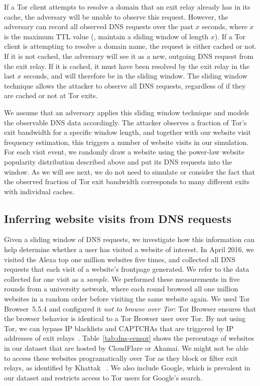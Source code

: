 If a Tor client attempts to resolve a domain that an exit relay already has in
its cache, the adversary will be unable to observe this request.  However, the
adversary can record all observed DNS requests over the past $x$
seconds, where $x$ is the maximum TTL value (\ie, maintain a sliding window of
length $x$).  If a Tor client
is attempting to resolve a domain name, the request is either cached or not.  If
it is not cached, the adversary will see it as a new, outgoing DNS request from
the exit relay. If it is cached, it must have been resolved by the exit relay in
the last $x$ seconds, and will therefore be in the sliding window.  The sliding
window technique allows the attacker to observe all DNS requests, regardless of
if they are cached or not at Tor exits.

We assume that an adversary applies this sliding window technique and models the
observable DNS data accordingly.  The attacker observes a fraction of Tor's exit
bandwidth for a specific window length, and together with our website visit
frequency estimation, this triggers a number of website visits in our
simulation.  For each visit event, we randomly draw a website using the
power-law website popularity distribution described above and put its DNS
requests into the window. As we will see next, we do not need to simulate or
consider the fact that the observed fraction of Tor exit bandwidth corresponds
to many different exits with individual caches.

\subsection{Inferring website visits from DNS requests}
\label{sec:dns2site}

Given a sliding window of DNS requests, we investigate how this information can
help determine whether a user has visited a website of interest.  In April 2016,
we visited the Alexa top one million websites five times, and collected all DNS
requests that each visit of a website's frontpage generated.  We refer to the
data collected for one visit as a \emph{sample}.  We performed these
measurements in five rounds from a university network, where each round browsed
all one million websites in a random order before visiting the same website
again. We used Tor Browser~5.5.4 and configured it {\em not to browse over Tor}:
Tor Browser ensures that the browser behavior is identical to a Tor Browser user
over Tor. By not using Tor, we can bypass IP blacklists and CAPTCHAs that are
triggered by IP addresses of exit relays~\cite{Khattak2016a}.
Table~\ref{tab:dns-censor} shows the percentage of websites in our dataset that
are hosted by CloudFlare or Akamai.  We might not be able to access these
websites programatically over Tor as they block or filter exit relays, as
identified by Khattak \ea~\cite{Khattak2016a}. We also include Google, which is
prevalent in our dataset and restricts access to Tor users for Google's search.

